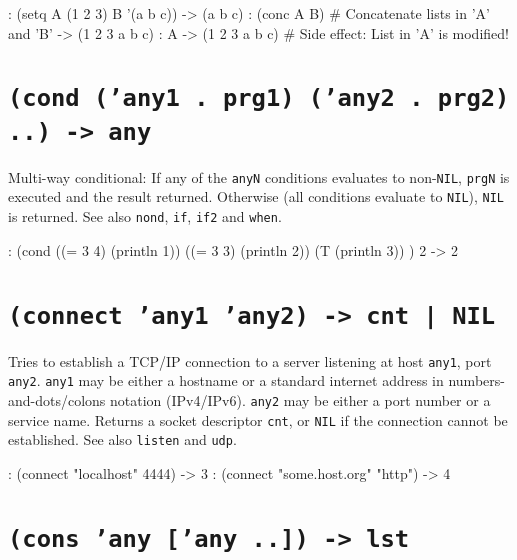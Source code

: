 \begin{wideverbatim}
: (setq  A (1 2 3)  B '(a b c))
-> (a b c)
: (conc A B)                        # Concatenate lists in 'A' and 'B'
-> (1 2 3 a b c)
: A
-> (1 2 3 a b c)                    # Side effect: List in 'A' is modified!
\end{wideverbatim}

 
\section*{\texttt{(cond ('any1 . prg1) ('any2 . prg2) ..) -> any}}
\label{sec:funct-rec-C-(cond-('any1-.-prg1)-('any2-.-prg2)-..)-->-any}


Multi-way conditional: If any of the \texttt{anyN} conditions evaluates to
non-\texttt{NIL}, \texttt{prgN} is executed and the result returned. Otherwise (all
conditions evaluate to \texttt{NIL}), \texttt{NIL} is returned. See also \texttt{nond}, \texttt{if},
\texttt{if2} and \texttt{when}.


\begin{wideverbatim}
: (cond
   ((= 3 4) (println 1))
   ((= 3 3) (println 2))
   (T (println 3)) )
2
-> 2
\end{wideverbatim}

 
\section*{\texttt{(connect 'any1 'any2) -> cnt | NIL}}
\label{sec:funct-rec-C-(connect-'any1-'any2)-->-cnt-|-nil}


Tries to establish a TCP/IP connection to a server listening at host
\texttt{any1}, port \texttt{any2}. \texttt{any1} may be either a hostname or a standard
internet address in numbers-and-dots/colons notation (IPv4/IPv6). \texttt{any2}
may be either a port number or a service name. Returns a socket
descriptor \texttt{cnt}, or \texttt{NIL} if the connection cannot be established. See
also \texttt{listen} and \texttt{udp}.


\begin{wideverbatim}
: (connect "localhost" 4444)
-> 3
: (connect "some.host.org" "http")
-> 4
\end{wideverbatim}

 
\section*{\texttt{(cons 'any ['any ..]) -> lst}}
\label{sec:funct-rec-C-(cons-'any-['any-..])-->-lst}


